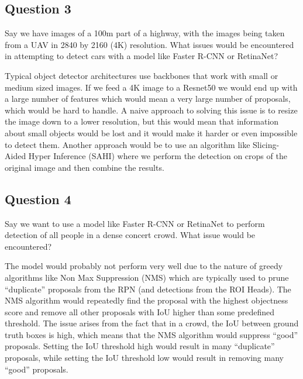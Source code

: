 \documentclass{article}
\begin{document}
\subsection{Question 3}
\begin{tcolorbox}
    Say we have images of a 100m part of a highway, with the images being taken from a UAV in 2840 by 2160 (4K) resolution. What issues would be encountered in attempting to detect cars with a model like Faster R-CNN or RetinaNet?
\end{tcolorbox}
Typical object detector architectures use backbones that work with small or medium sized images. If we feed a 4K image to a Resnet50 we would end up with a large number of features which would mean a very large number of proposals, which would be hard to handle. A naive approach to solving this issue is to resize the image down to a lower resolution, but this would mean that information about small objects would be lost and it would make it harder or even impossible to detect them. Another approach would be to use an algorithm like Slicing-Aided Hyper Inference (SAHI) \cite{sahi} where we perform the detection on crops of the original image and then combine the results.

\subsection{Question 4}
\begin{tcolorbox}
    Say we want to use a model like Faster R-CNN or RetinaNet to perform detection of all people in a dense concert crowd. What issue would be encountered?
\end{tcolorbox}
The model would probably not perform very well due to the nature of greedy algorithms like Non Max Suppression (NMS) which are typically used to prune “duplicate” proposals from the RPN (and detections from the ROI Heads). The NMS algorithm would repeatedly find the proposal with the highest objectness score and remove all other proposals with IoU higher than some predefined threshold. The issue arises from the fact that in a crowd, the IoU between ground truth boxes is high, which means that the NMS algorithm would suppress “good” proposals. Setting the IoU threshold high would result in many “duplicate” proposals, while setting the IoU threshold low would result in removing many “good” proposals.






\appendix
\end{document}
